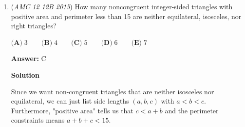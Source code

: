 \begin{enumerate}
 $\textbf{(A)}\; \dfrac{1}{2} \qquad\textbf{(B)}\; \dfrac{3}{5} \qquad\textbf{(C)}\; \dfrac{2}{3} \qquad\textbf{(D)}\; \dfrac{3}{4} \qquad\textbf{(E)}\; \dfrac{4}{5}$

 \textbf{Answer: }C



\textbf{Solution 1}

If Larry wins, he either wins on the first move, or the third move, or the fifth move, etc. Let $W$ represent "player wins", and $L$ represent "player loses". Then the events corresponding to Larry winning are $W, LLW, LLLLW, LLLLLLW, \ldots$

 Thus the probability of Larry winning is

 $\frac{1}{2} + \frac{1}{2^3} + \frac{1}{2^5} + \frac{1}{2^7} + \cdots$

 This is a geometric series with ratio $\frac{1}{2^2}=\frac{1}{4}$, hence the answer is $\frac{1}{2} \cdot \frac{1}{1 - \frac{1}{4}} = \boxed{\textbf{(C)}\; \frac{2}{3}}$.

 



\textbf{Solution 2}

Break the problem up into two separate cases: (a) Larry wins on the first throw or (b) Larry wins after the first throw.

 a: The probability that Larry wins on the first throw is $\frac{1}{2}$.

 b: The probability that Larry wins after the first throw is half the probability that Julius wins because it only occurs half the time. This probability is $\frac{1}{2}(1-x)$, where $x$ is the probability that Larry wins.

 Therefore, $x = \frac{1}{2} + \frac{1}{2}(1 - x)$. This equation can be solved for $x$ to find that the probability that Larry wins is $\boxed{\textbf{(C)}\; \frac{2}{3}}$.

 


	\item (\textit{AMC 12 12B 2015}) How many noncongruent integer-sided triangles with positive area and perimeter less than 15 are neither equilateral, isosceles, nor right triangles?


 $\textbf{(A)}\; 3 \qquad\textbf{(B)}\; 4 \qquad\textbf{(C)}\; 5 \qquad\textbf{(D)}\; 6 \qquad\textbf{(E)}\; 7$

 \textbf{Answer: }C



\textbf{Solution}

Since we want non-congruent triangles that are neither isosceles nor equilateral, we can just list side lengths $(a,b,c)$ with $a<b<c$. Furthermore, "positive area" tells us that $c < a + b$ and the perimeter constraints means $a+b+c < 15$.


\end{enumerate}
